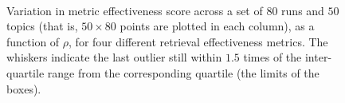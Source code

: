 \documentclass[runningheads,a4paper]{llncs}
\begin{document}
\begin{figure}[t!]
\centering
{}
\\
\caption{Variation in metric effectiveness score across a set of $80$
runs and $50$ topics (that is, $50 \times 80$ points are plotted in
each column), as a function of $\rho$, for four different retrieval
effectiveness metrics.
The whiskers indicate the last outlier still within $1.5$ times of
the inter-quartile range from the corresponding quartile (the limits
of the boxes).
\label{fig-score-variation}}
\end{figure}
\end{document}
